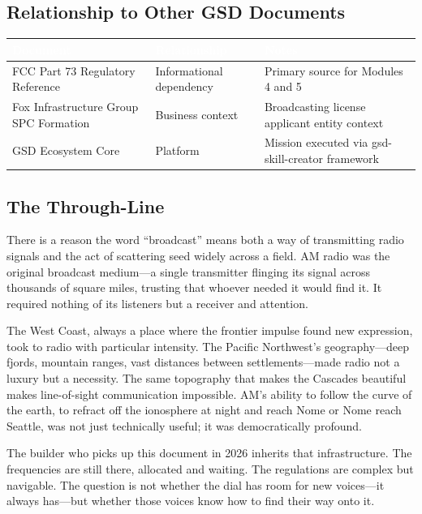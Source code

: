 \documentclass[11pt,letterpaper]{article}
\newcommand{\tableheader}[1]{\textbf{\sffamily\textcolor{white}{#1}}}
\begin{document}
\begin{asciibox}
\subsection{Relationship to Other GSD Documents}

\begin{center}
\begin{tabularx}{\textwidth}{L{3.5cm}L{4cm}X}
\toprule
{}
\tableheader{Document} & \tableheader{Relationship} & \tableheader{Notes} \\
\midrule
FCC Part 73 Regulatory Reference & Informational dependency & Primary source for Modules 4 and 5 \\
Fox Infrastructure Group SPC Formation & Business context & Broadcasting license applicant entity context \\
GSD Ecosystem Core & Platform & Mission executed via gsd-skill-creator framework \\
\bottomrule
\end{tabularx}
\end{center}

\subsection{The Through-Line}

There is a reason the word ``broadcast'' means both a way of transmitting radio signals and the
act of scattering seed widely across a field. AM radio was the original broadcast medium---a
single transmitter flinging its signal across thousands of square miles, trusting that whoever
needed it would find it. It required nothing of its listeners but a receiver and attention.

The West Coast, always a place where the frontier impulse found new expression, took to radio
with particular intensity. The Pacific Northwest's geography---deep fjords, mountain ranges,
vast distances between settlements---made radio not a luxury but a necessity. The same topography
that makes the Cascades beautiful makes line-of-sight communication impossible. AM's ability to
follow the curve of the earth, to refract off the ionosphere at night and reach Nome or Nome
reach Seattle, was not just technically useful; it was democratically profound.

The builder who picks up this document in 2026 inherits that infrastructure. The frequencies
are still there, allocated and waiting. The regulations are complex but navigable. The question
is not whether the dial has room for new voices---it always has---but whether those voices know
how to find their way onto it.


\end{asciibox}
\end{document}

